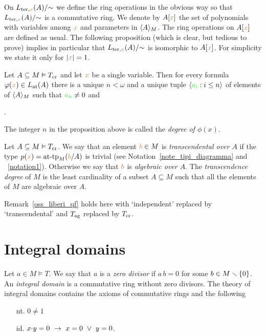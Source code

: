 On $L_{{\rm ter},{\mr x}}(A)/\mathord{\sim}$ we define the ring operations in the obvious way so that $L_{{\rm ter},{\mr x}}(A)/\mathord{\sim}$ is a commutative ring.
%
We denote by $A[{\mr x}]$ the set of polynomials with variables among ${\mr x}$ and parameters in $\<A\>_M$.
%
The ring operations on $A[{\mr x}]$ are defined as usual.
%
The following proposition (which is clear, but tedious to prove) implies in particular that $L_{{\rm ter},{\mr x}}(A)/\mathord{\sim}$ is isomorphic to $A[{\mr x}]$.
%
For simplicity we state it only for $|{\mr x}|=1$.

\begin{proposition}
\label{prop_formacanonicaterminiau}
Let  $A\subseteq M\models T_{\rm cr}$ and let ${\mr x}$ be a single variable.
%
Then for every formula $\phi({\mr x})\in L_{\rm at}(A)$ there is a unique $n<\omega$ and a unique tuple $\<{\gr a_i}:i\le n\>$ of elements of $\<A\>_M$ such that ${\gr a_n}\neq0$ and 

.
\end{proposition}

The integer $n$ in the proposition above is called the \emph{degree of $\phi(x)$}.

\begin{definition}\label{def_id_trans_alg}
   Let $A\subseteq M\models T_{\rm cr}$.
%
  We say that an element ${\mr b}\in M$ is \emph{transcendental over $A$\/} if the type $p({\mr x})=\attp_M({\mr b}/A)$ is trivial (see Notation~\ref{note_tipi_diagramma} and ~\ref{notation1}).
%
  Otherwise we say that ${\mr b}$ is \emph{algebraic over $A$}.
%
  The \emph{transcendence degree\/} of $M$ is the least cardinality of a subset $A\subseteq M$ such that all the elements of $M$ are algebraic over $A$.
\end{definition}  

\begin{remark}\label{oss_liberi_cr}
Remark~\ref{oss_liberi_qf} holds here with `independent' replaced by `transcendental' and $T_{\rm ag}$ replaced by $T_{\rm cr}$.
\end{remark}

\section{Integral domains}

Let $a\in M\models T$.
%
We say that $a$ is a \emph{zero divisor} if $a\,b=0$ for some $b\in M\sm\{0\}$.
%
An \emph{integral domain\/} is a commutative ring without zero divisors.
%
The theory of integral domains contains the axioms of commutative rings and the following
\begin{itemize}
\item[nt.] $0\neq 1$
\item[id.] $x\mdot y =0\ \imp\ x=0\ \vee\ y=0$.
\end{itemize}

